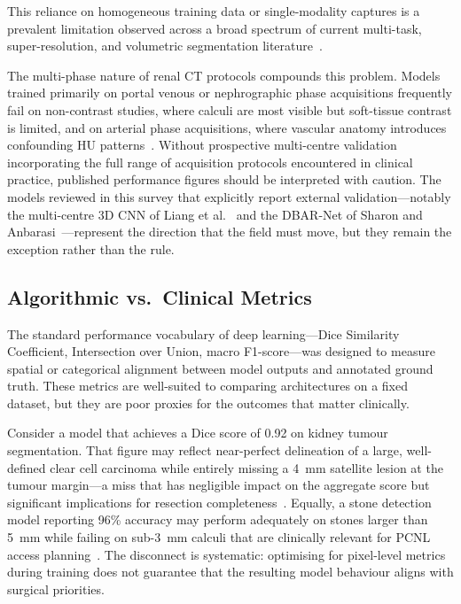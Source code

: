 \documentclass[pdflatex,sn-mathphys-num]{sn-jnl}%
\begin{document}
This reliance on homogeneous training data or single-modality captures is a prevalent limitation observed across a broad spectrum of current multi-task, super-resolution, and volumetric segmentation literature~\cite{abdalla2025axial, ma2022flare, macin2025kidneynext, xie2020seru, nguyen2025super, gao2026multitask, chen2023glunet, sherryl2022ied}.

The multi-phase nature of renal CT protocols compounds this problem. Models trained primarily on portal venous or nephrographic phase acquisitions frequently fail on non-contrast studies, where calculi are most visible but soft-tissue contrast is limited, and on arterial phase acquisitions, where vascular anatomy introduces confounding HU patterns~\cite{liang2025multicenter, ye2026automated}. Without prospective multi-centre validation incorporating the full range of acquisition protocols encountered in clinical practice, published performance figures should be interpreted with caution. The models reviewed in this survey that explicitly report external validation---notably the multi-centre 3D CNN of Liang et al.~\cite{liang2025multicenter} and the DBAR-Net of Sharon and Anbarasi~\cite{sharon2025attention}---represent the direction that the field must move, but they remain the exception rather than the rule.

\subsection{Algorithmic vs.\ Clinical Metrics}
\label{subsec:metrics_gap}

The standard performance vocabulary of deep learning---Dice Similarity Coefficient, Intersection over Union, macro F1-score---was designed to measure spatial or categorical alignment between model outputs and annotated ground truth. These metrics are well-suited to comparing architectures on a fixed dataset, but they are poor proxies for the outcomes that matter clinically.

Consider a model that achieves a Dice score of 0.92 on kidney tumour segmentation. That figure may reflect near-perfect delineation of a large, well-defined clear cell carcinoma while entirely missing a 4~mm satellite lesion at the tumour margin---a miss that has negligible impact on the aggregate score but significant implications for resection completeness~\cite{raj2022deep, gohil2024kidney}. Equally, a stone detection model reporting 96\% accuracy may perform adequately on stones larger than 5~mm while failing on sub-3~mm calculi that are clinically relevant for PCNL access planning~\cite{ye2026automated}. The disconnect is systematic: optimising for pixel-level metrics during training does not guarantee that the resulting model behaviour aligns with surgical priorities.
\end{document}
